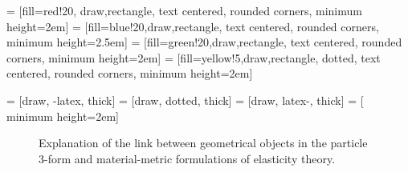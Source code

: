 
 = [fill=red!20, draw,rectangle,  text centered, rounded corners, minimum height=2em]
 = [fill=blue!20,draw,rectangle,  text centered, rounded corners, minimum height=2.5em]
 = [fill=green!20,draw,rectangle,  text centered, rounded corners, minimum height=2em]
 = [fill=yellow!5,draw,rectangle,   dotted, text centered, rounded corners, minimum height=2em]

 = [draw,  -latex,   thick]
 = [draw,  dotted, thick]
 = [draw,  latex-,   thick]
 = [ minimum height=2em]

\begin{figure}[!t]
\begin{centering}
\caption{Explanation of the link between geometrical objects in  the particle 3-form and material-metric formulations of elasticity theory. }\label{fig:obj_links}
\end{centering}
\end{figure}
 